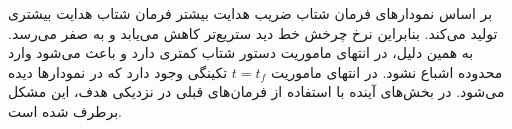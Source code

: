 بر اساس نمودارهای فرمان شتاب ضریب هدایت بیشتر فرمان شتاب هدایت بیشتری تولید می‌کند. بنابراین نرخ چرخش خط دید ستریع‌تر کاهش می‌یابد و به صفر می‌رسد. به همین دلیل، در انتهای ماموریت دستور شتاب کمتری دارد و باعث می‌شود وارد محدوده اشباع نشود. در انتهای ماموریت $t= t_f$ تکینگی وجود دارد که در نمودارها دیده می‌شود. در بخش‌های آینده با استفاده از فرمان‌های قبلی در نزدیکی هدف، این مشکل برطرف شده است.